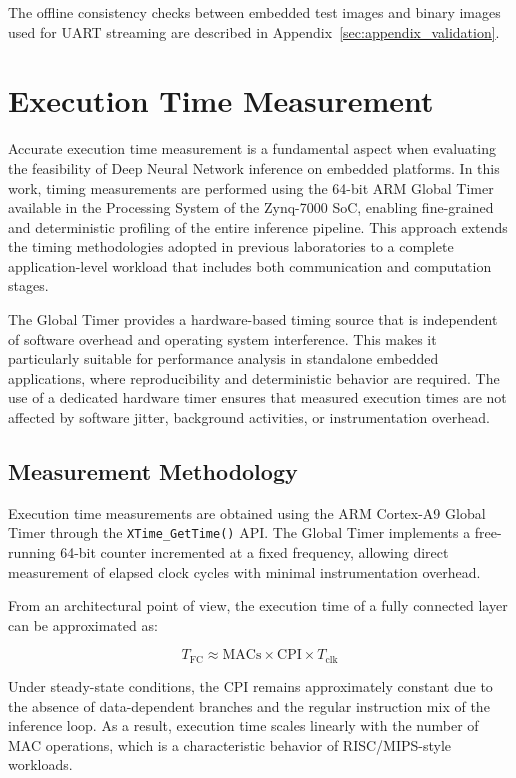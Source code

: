 The offline consistency checks between embedded test images and binary images
used for UART streaming are described in Appendix~\ref{sec:appendix_validation}.


\chapter{Execution Time Measurement}

Accurate execution time measurement is a fundamental aspect when evaluating the
feasibility of Deep Neural Network inference on embedded platforms.
In this work, timing measurements are performed using the 64-bit ARM Global Timer
available in the Processing System of the Zynq-7000 SoC, enabling fine-grained and
deterministic profiling of the entire inference pipeline.
This approach extends the timing methodologies adopted in previous laboratories
to a complete application-level workload that includes both communication and
computation stages.

The Global Timer provides a hardware-based timing source that is independent of
software overhead and operating system interference.
This makes it particularly suitable for performance analysis in standalone
embedded applications, where reproducibility and deterministic behavior are
required.
The use of a dedicated hardware timer ensures that measured execution times are
not affected by software jitter, background activities, or instrumentation
overhead.


\section{Measurement Methodology}

Execution time measurements are obtained using the ARM Cortex-A9 Global Timer
through the \texttt{XTime\_GetTime()} API.
The Global Timer implements a free-running 64-bit counter incremented at a fixed
frequency, allowing direct measurement of elapsed clock cycles with minimal
instrumentation overhead.

From an architectural point of view, the execution time of a fully connected
layer can be approximated as:

\[
T_{\text{FC}} \approx \text{MACs} \times \text{CPI} \times T_{\text{clk}}
\]

Under steady-state conditions, the CPI remains approximately constant due to
the absence of data-dependent branches and the regular instruction mix of the
inference loop.
As a result, execution time scales linearly with the number of MAC operations,
which is a characteristic behavior of RISC/MIPS-style workloads.


